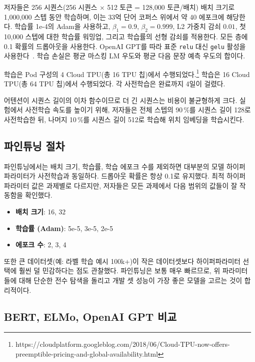 저자들은 256 시퀀스(256 시퀀스 × 512 토큰 = 128,000 토큰/배치) 배치 크기로 1,000,000 스텝 동안 학습하며, 이는 33억 단어 코퍼스 위에서 약 40 에포크에 해당한다. 학습률 1e-4의 Adam을 사용하고, ${\beta}_1=0.9$, ${\beta}_2=0.999$, L2 가중치 감쇠 $0.01$, 첫 10,000 스텝에 대한 학습률 워밍업, 그리고 학습률의 선형 감쇠를 적용한다. 모든 층에 0.1 확률의 드롭아웃을 사용한다. OpenAI GPT를 따라 표준 {\tt relu} 대신 {\tt gelu} 활성을 사용한다~\cite{hendrycks:2016}. 학습 손실은 평균 마스킹 LM 우도와 평균 다음 문장 예측 우도의 합이다.

 학습은 Pod 구성의 4 Cloud TPU(총 16 TPU 칩)에서 수행되었다.\footnote{https://cloudplatform.googleblog.com/2018/06/Cloud-TPU-now-offers-preemptible-pricing-and-global-availability.html}  학습은 16 Cloud TPU(총 64 TPU 칩)에서 수행되었다. 각 사전학습은 완료까지 4일이 걸렸다.

어텐션이 시퀀스 길이의 이차 함수이므로 더 긴 시퀀스는 비용이 불균형하게 크다. 실험에서 사전학습 속도를 높이기 위해, 저자들은 전체 스텝의 90\,\%를 시퀀스 길이 128로 사전학습한 뒤, 나머지 10\,\%를 시퀀스 길이 512로 학습해 위치 임베딩을 학습시킨다.

\subsection{파인튜닝 절차}
파인튜닝에서는 배치 크기, 학습률, 학습 에포크 수를 제외하면 대부분의 모델 하이퍼파라미터가 사전학습과 동일하다. 드롭아웃 확률은 항상 0.1로 유지했다. 최적 하이퍼파라미터 값은 과제별로 다르지만, 저자들은 모든 과제에서 다음 범위의 값들이 잘 작동함을 확인했다.

\begin{itemize}[noitemsep]
\item {\bf 배치 크기}: 16, 32
\item {\bf 학습률 (Adam)}: 5e-5, 3e-5, 2e-5
\item {\bf 에포크 수}: 2, 3, 4
\end{itemize}

또한 큰 데이터셋(예: 라벨 학습 예시 100k+)이 작은 데이터셋보다 하이퍼파라미터 선택에 훨씬 덜 민감하다는 점도 관찰했다. 파인튜닝은 보통 매우 빠르므로, 위 파라미터들에 대해 단순한 전수 탐색을 돌리고 개발 셋 성능이 가장 좋은 모델을 고르는 것이 합리적이다.

\subsection{BERT, ELMo, OpenAI GPT 비교}
\label{appendix:sec:comparing_bert_and_openai}

